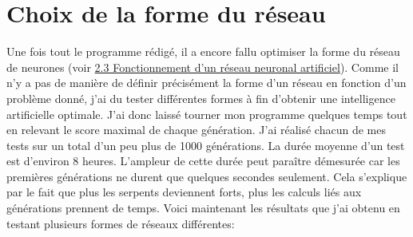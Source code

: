 \documentclass[12pt, a4paper, openany]{book}
\begin{document}
\section{Choix de la forme du réseau}
\label{r:2.8}
Une fois tout le programme rédigé, il a encore fallu optimiser la forme du réseau de neurones (voir \hyperref[r:2.3]{2.3 Fonctionnement d'un réseau neuronal artificiel}). Comme il n'y a pas de manière de définir précisément la forme d'un réseau en fonction d'un problème donné, j'ai du tester différentes formes à fin d'obtenir une intelligence artificielle optimale. J'ai donc laissé tourner mon programme quelques temps tout en relevant le score maximal de chaque génération. J'ai réalisé chacun de mes tests sur un total d'un peu plus de 1000 générations. La durée moyenne d'un test est d'environ 8 heures. L'ampleur de cette durée peut paraître démesurée car les premières générations ne durent que quelques secondes seulement. Cela s'explique par le fait que plus les serpents deviennent forts, plus les calculs liés aux générations prennent de temps. Voici maintenant les résultats que j'ai obtenu en testant plusieurs formes de réseaux différentes:
\end{document}
